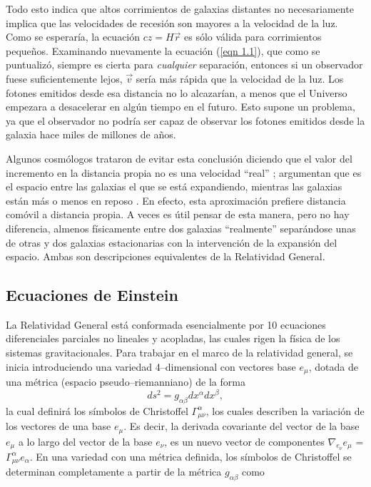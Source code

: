 \documentclass[a4paper,openright,10pt, oneside, final]{book}
\begin{document}
Todo esto indica que altos corrimientos de galaxias distantes no necesariamente implica que las velocidades de recesión son mayores a la velocidad de la luz. Como se esperaría, la ecuación $cz = H\vec{r}$ es sólo válida para corrimientos pequeños. Examinando nuevamente la ecuación (\ref{eqn 1.1}), que como se puntualizó, siempre es cierta para \textit{cualquier} separación, entonces si un observador fuese suficientemente lejos, $\vec{v}$ sería más rápida que la velocidad de la luz. Los fotones emitidos desde esa distancia no lo alcazarían, a menos que el Universo empezara a desacelerar en algún tiempo en el futuro. Esto supone un problema, ya que el observador no podría ser capaz de observar los fotones emitidos desde la galaxia hace miles de millones de años.

Algunos cosmólogos trataron de evitar esta conclusión diciendo que el valor del incremento en la distancia propia no es una velocidad ``real'' \cite{1.1.01}; argumentan que es el espacio entre las galaxias el que se está expandiendo, mientras las galaxias están más o menos en reposo \cite{1.1.02}. En efecto, esta aproximación prefiere distancia comóvil a distancia propia. A veces es útil pensar de esta manera, pero no hay diferencia, almenos físicamente entre dos galaxias ``realmente'' separándose unas de otras y dos galaxias estacionarias con la intervención de la expansión del espacio. Ambas son descripciones equivalentes de la Relatividad General.

\subsection*{Ecuaciones de Einstein}

La Relatividad General está conformada esencialmente por 10 ecuaciones diferenciales parciales no lineales y acopladas, las cuales rigen la física de los sistemas gravitacionales. Para trabajar en el marco de la relatividad general, se inicia introduciendo una variedad 4--dimensional con vectores base $e_{\mu}$, dotada de una métrica (espacio pseudo--riemanniano) de la forma
\begin{equation}
ds^{2}=g_{\alpha \beta}dx^{\alpha}dx^{\beta},\label{eqn 1.11}
\end{equation}
la cual definirá los símbolos de Christoffel $\Gamma^{\alpha}_{\mu \nu}$, los cuales describen la variación de los vectores de una base $e_{\mu}$. Es decir, la derivada covariante del vector de la base $e_{\mu}$ a lo largo del vector de la base $e_{\nu}$, es un nuevo vector de componentes $\nabla_{e_{\nu}}e_{\mu}$ = $\Gamma^{\alpha}_{\mu \nu} e_{\alpha}$. En una variedad con una métrica definida, los símbolos de Christoffel se determinan completamente a partir de la métrica $g_{\alpha \beta}$ \cite{1.4} como
\end{document}
